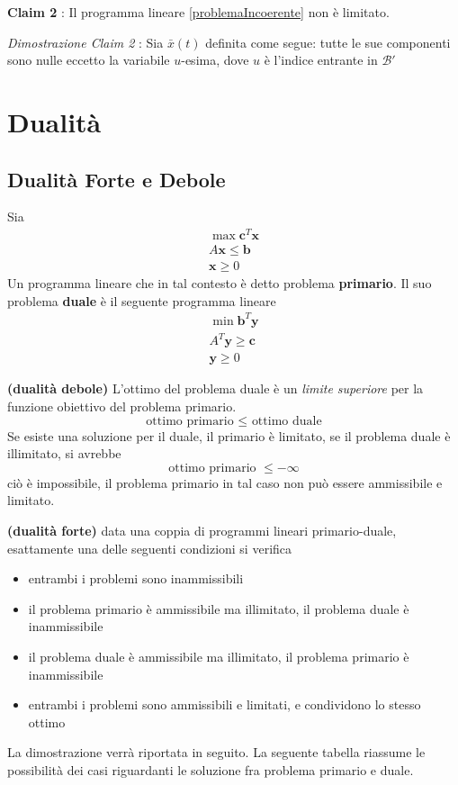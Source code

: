\documentclass[10pt, letterpaper]{report}
\begin{document}
\bigskip\textbf{Claim 2} : Il programma lineare  \ref{problemaIncoerente} non è limitato.\bigskip 
 
\textit{Dimostrazione Claim 2} : Sia $\bar x(t)$ definita come segue: tutte le sue componenti sono nulle eccetto la variabile $u$-esima, dove $u$ è l'indice entrante in $\mathcal B'$ 
 


\chapter{Dualità}
\section{Dualità Forte e Debole}
\begin{definizione}
    Sia \begin{eqnarray*}
        \max \mathbf c^T\mathbf x\\ 
        A\mathbf x \le \mathbf b \\ 
        \mathbf x \ge 0 
    \end{eqnarray*}
    Un programma lineare che in tal contesto è detto problema \textbf{primario}. Il suo problema \textbf{duale} è il seguente programma lineare 
    \begin{eqnarray*}
        \min \mathbf b^T\mathbf y\\ 
        A^T\mathbf y \ge \mathbf c \\ 
        \mathbf y \ge 0 
    \end{eqnarray*}
\end{definizione}
 \begin{teorema}
    \textbf{(dualità debole)} L'ottimo del problema duale è un \textit{limite superiore} per la funzione obiettivo del problema primario. $$ \text{ottimo primario }\le \text{ ottimo duale}$$Se esiste una soluzione per il duale, il primario è limitato, se il problema duale è illimitato, si avrebbe 
    $$ \text{ottimo primario }\le -\infty$$
    ciò è impossibile, il problema primario in tal caso non può essere ammissibile e limitato.
\end{teorema}
\begin{teorema}\label{dualità forte}
\textbf{(dualità forte)} data una coppia di programmi lineari primario-duale, esattamente una delle seguenti condizioni si verifica\begin{itemize}
    \item entrambi i problemi sono inammissibili 
    \item il problema primario è ammissibile ma illimitato, il problema duale è inammissibile 
    \item il problema duale è ammissibile ma illimitato, il problema primario è inammissibile
    \item entrambi i problemi sono ammissibili e limitati, e condividono lo stesso ottimo
\end{itemize}
\end{teorema}
La dimostrazione verrà riportata in seguito. La seguente tabella riassume le possibilità dei casi riguardanti le soluzione fra problema primario e duale.
\end{document}
